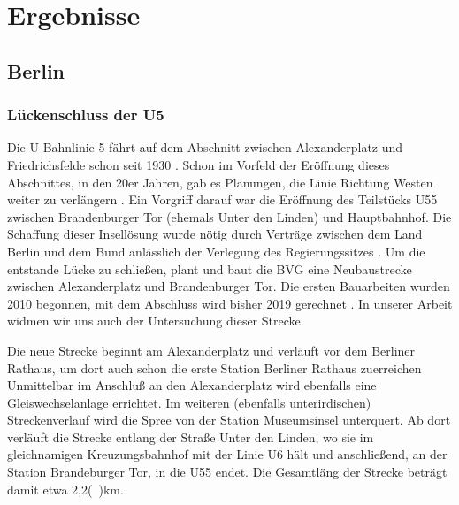 \chapter{Ergebnisse}

\begin{comment}

Gliederung meiner Streckenbeschreibung (Yves)

* Übersicht
  * Umfeld des Bauprojekts
  * von wo nach wo
  * historische Einordnung

* konkrter Streckenverlauf
* detalierte Daten (weichen etc ..)


* Probleme
  * bautechnisch
  * gesellschaftlich

* Zeitplan

* Kosten
\end{comment}



\section{Berlin}
\subsection*{Lückenschluss der U5}

Die U-Bahnlinie 5 fährt auf dem Abschnitt zwischen Alexanderplatz und
Friedrichsfelde schon seit 1930 \cite{bkhU5}. Schon im Vorfeld der Eröffnung
dieses Abschnittes, in den 20er Jahren, gab es Planungen, die Linie Richtung
Westen weiter zu verlängern \cite{bvgWebsiteU5}. Ein Vorgriff darauf war die
Eröffnung des Teilstücks U55 zwischen Brandenburger Tor (ehemals Unter den
Linden) und Hauptbahnhof. Die Schaffung dieser Insellösung wurde nötig durch
Verträge zwischen dem Land Berlin und dem Bund anlässlich der Verlegung des
Regierungssitzes \cite{hauptstadtvertrag}. Um die entstande Lücke zu schließen,
plant und baut die BVG eine Neubaustrecke zwischen Alexanderplatz und
Brandenburger Tor. Die ersten Bauarbeiten wurden 2010 begonnen, mit dem
Abschluss wird bisher 2019 gerechnet \cite{bvgWebsiteU5plan}. In unserer Arbeit
widmen wir uns auch der Untersuchung dieser Strecke.

Die neue Strecke beginnt am Alexanderplatz und verläuft vor dem Berliner
Rathaus, um dort auch schon die erste Station Berliner Rathaus zuerreichen
\cite{bkhU5} \cite{bvgWebsiteU5} Unmittelbar im Anschluß an den Alexanderplatz
wird ebenfalls eine Gleiswechselanlage errichtet. Im weiteren (ebenfalls
unterirdischen) Streckenverlauf wird die Spree von der Station Museumsinsel
unterquert. Ab dort verläuft die Strecke entlang der Straße Unter den Linden, wo
sie im gleichnamigen Kreuzungsbahnhof mit der Linie U6 hält und anschließend, an
der Station Brandeburger Tor, in die U55 endet. Die Gesamtläng der Strecke
beträgt damit etwa 2,2(\ )km.

